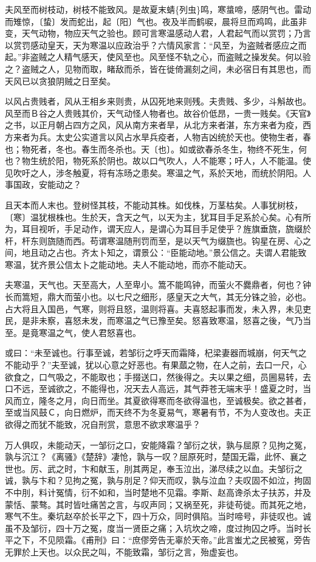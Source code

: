 \documentclass[]{article}
\begin{document}
夫风至而树枝动，树枝不能致风。是故夏末蜻\{列虫\}鸣，寒螀啼，感阴气也。雷动而雉惊，〔蛰〕发而蛇出，起〔阳〕气也。夜及半而鹤唳，晨将旦而鸡鸣，此虽非变，天气动物，物应天气之验也。顾可言寒温感动人君，人君起气而以赏罚；乃言以赏罚感动皇天，天为寒温以应政治乎？六情风家言：``风至，为盗贼者感应之而起。''非盗贼之人精气感天，使风至也。风至怪不轨之心，而盗贼之操发矣。何以验之？盗贼之人，见物而取，睹敌而杀，皆在徙倚漏刻之间，未必宿日有其思也，而天风已以贪狼阴贼之日至矣。

以风占贵贱者，风从王相乡来则贵，从囚死地来则残。夫贵贱、多少，斗斛故也。风至而Ｂ谷之人贵贱其价，天气动怪人物者也。故谷价低昂，一贵一贱矣。《天官》之书，以正月朝占四方之风，风从南方来者旱，从北方来者湛，东方来者为疫，西方来者为兵。太史公实道言以风占水旱兵疫者，人物吉凶统於天也。使物生者，春也；物死者，冬也。春生而冬杀也。天〔也〕。如或欲春杀冬生，物终不死生，何也？物生统於阳，物死系於阴也。故以口气吹人，人不能寒；吁人，人不能温。使见吹吁之人，涉冬触夏，将有冻旸之患矣。寒温之气，系於天地，而统於阴阳。人事国政，安能动之？

且天本而人末也。登树怪其枝，不能动其株。如伐株，万茎枯矣。人事犹树枝，〔寒〕温犹根株也。生於天，含天之气，以天为主，犹耳目手足系於心矣。心有所为，耳目视听，手足动作，谓天应人，是谓心为耳目手足使乎？旌旗垂旒，旒缀於杆，杆东则旒随而西。苟谓寒温随刑罚而至，是以天气为缀旒也。钩星在房、心之间，地且动之占也。齐太卜知之，谓景公：``臣能动地。''景公信之。夫谓人君能致寒温，犹齐景公信太卜之能动地。夫人不能动地，而亦不能动天。

夫寒温，天气也。天至高大，人至卑小。篙不能鸣钟，而萤火不爨鼎者，何也？钟长而篙短，鼎大而萤小也。以七尺之细形，感皇天之大气，其无分铢之验，必也。占大将且入国邑，气寒，则将且怒，温则将喜。夫喜怒起事而发，未入界，未见吏民，是非未察，喜怒未发，而寒温之气已豫至矣。怒喜致寒温，怒喜之後，气乃当至。是竟寒温之气，使人君怒喜也。

或曰：``未至诚也。行事至诚，若邹衍之呼天而霜降，杞梁妻器而城崩，何天气之不能动乎？''夫至诚，犹以心意之好恶也。有果蓏之物，在人之前，去口一尺，心欲食之，口气吸之，不能取也；手掇送口，然後得之。夫以果之细，员圌易转，去口不远，至诚欲之，不能得也，况天去人高远，其气莽苍无端末乎！盛夏之时，当风而立，隆冬之月，向日而坐。其夏欲得寒而冬欲得温也，至诚极矣。欲之甚者，至或当风鼓Ｃ，向日燃炉，而天终不为冬夏易气，寒暑有节，不为人变改也。夫正欲得之而犹不能致，况自刑赏，意思不欲求寒温乎？

万人俱叹，未能动天，一邹衍之口，安能降霜？邹衍之状，孰与屈原？见拘之冤，孰与沉江？《离骚》《楚辞》凄怆，孰与一叹？屈原死时，楚国无霜，此怀、襄之世也。厉、武之时，卞和献玉，刖其两足，奉玉泣出，涕尽续之以血。夫邹衍之诚，孰与卞和？见拘之冤，孰与刖足？仰天而叹，孰与泣血？夫叹固不如泣，拘固不中刖，料计冤情，衍不如和，当时楚地不见霜。李斯、赵高谗杀太子扶苏，并及蒙恬、蒙骜。其时皆吐痛苦之言，与叹声同；又祸至死，非徒苟徙。而其死之地，寒气不生。秦坑赵卒於长平之下，四十万众，同时俱陷。当时啼号，非徒叹也。诚虽不及邹衍，四十万之冤，度当一贤臣之痛；入坑坎之啼，度过拘囚之呼。当时长平之下，不见陨霜。《甫刑》曰：``庶僇旁告无辜於天帝。''此言蚩尤之民被冤，旁告无罪於上天也。以众民之叫，不能致霜，邹衍之言，殆虚妄也。
\end{document}

